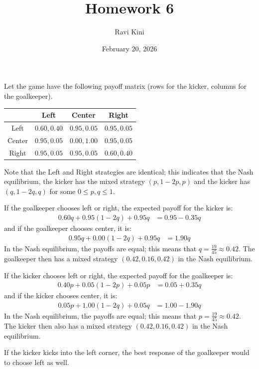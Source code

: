 \documentclass{article}
\title{Homework 6}
\author{Ravi Kini}
\date{February 20, 2026}
\begin{document}
\maketitle

\problem{}
Let the game have the following payoff matrix (rows for the kicker, columns for the goalkeeper).
\begin{center}
\begin{tabular}{|c|c|c|c|}
    \hline
     & Left & Center & Right \\
     \hline
     Left & $0.60, 0.40$ & $0.95, 0.05$ & $0.95, 0.05$ \\
     \hline
     Center & $0.95, 0.05$ & $0.00, 1.00$ & $0.95, 0.05$ \\
     \hline
     Right & $0.95, 0.05$ & $0.95, 0.05$ & $0.60, 0.40$ \\
     \hline
\end{tabular}
\end{center}
Note that the Left and Right strategies are identical; this indicates that the Nash equilibrium, the kicker has the mixed strategy $(p, 1 - 2p, p)$ and the kicker has $(q, 1 - 2q, q)$ for some $0 \leq p, q \leq 1$.

If the goalkeeper chooses left or right, the expected payoff for the kicker is:
\begin{align*}
    0.60q + 0.95(1 - 2q) + 0.95q & = 0.95 - 0.35q
\end{align*}
and if the goalkeeper chooses center, it is:
\begin{align*}
    0.95q + 0.00(1 - 2q) + 0.95q & = 1.90q
\end{align*}
In the Nash equilibrium, the payoffs are equal; this means that $q = \frac{19}{45} \approx 0.42$. The goalkeeper then has a mixed strategy $(0.42, 0.16, 0.42)$ in the Nash equilibrium.

If the kicker chooses left or right, the expected payoff for the goalkeeper is:
\begin{align*}
    0.40p + 0.05(1 - 2p) + 0.05p & = 0.05 + 0.35q
\end{align*}
and if the kicker chooses center, it is:
\begin{align*}
    0.05p + 1.00(1 - 2q) + 0.05q & = 1.00 - 1.90q
\end{align*}
In the Nash equilibrium, the payoffs are equal; this means that $p = \frac{19}{45} \approx 0.42$. The kicker then also has a mixed strategy $(0.42, 0.16, 0.42)$ in the Nash equilibrium.

If the kicker kicks into the left corner, the best response of the goalkeeper would to choose left as well.
\end{document}
